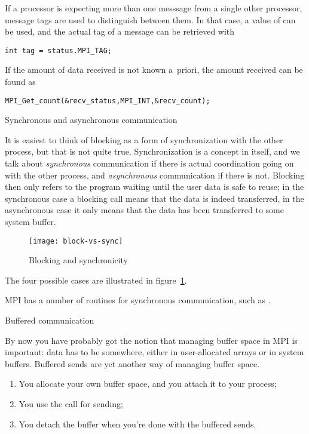 If a processor is expecting more than one messsage from a single other processor,
message tags are used to distinguish between them. In that case,
a value of  can be used, and the actual tag
of a message can be retrieved with
\begin{verbatim}
int tag = status.MPI_TAG;
\end{verbatim}

If the amount of data received is not known a~priori, the amount received
can be found as
\begin{verbatim}
MPI_Get_count(&recv_status,MPI_INT,&recv_count);
\end{verbatim}

 {Synchronous and asynchronous communication}


It is easiest to think of blocking as a form of synchronization with
the other process, but that is not quite true. Synchronization is a
concept in itself, and we talk about \emph{synchronous} communication
if there is actual coordination going on with the other process,
and \emph{asynchronous} communication if there is not. Blocking then
only refers to the program waiting until the user data is safe
to reuse; in the synchronous case a blocking call means that the data
is indeed transferred, in the asynchronous case it only means that the
data has been transferred to some system buffer.
%
\begin{figure}[ht]
\texttt{[image: block-vs-sync]}
\caption{Blocking and synchronicity}
\label{fig:block-sync}
\end{figure}
The four possible cases are illustrated in figure~\ref{fig:block-sync}.

MPI has a number of routines for synchronous communication,
such as .


 {Buffered communication}
\label{sec:buffered}

By now you have probably got the notion that managing buffer
space in MPI is important: data has to be somewhere, either in
user-allocated arrays or in system buffers. Buffered sends are yet another
way of managing buffer space.
\begin{enumerate}
\item You allocate your own buffer space, and you attach it to your process;
\item You use the  call for sending;
\item You detach the buffer when you're done with the buffered sends.
\end{enumerate}

